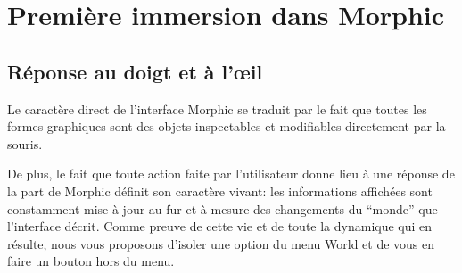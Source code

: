 \documentclass[a4paper,10pt,twoside]{book}
\begin{document}
\section{Première immersion dans Morphic}

\subsection{Réponse au doigt et à l'\oe il}
Le caractère direct de l'interface Morphic se traduit par le fait
que toutes les formes graphiques sont des objets 
inspectables et modifiables directement par la souris.

De plus, le fait que toute action faite par l'utilisateur donne lieu
à une réponse de la part de Morphic définit son caractère
vivant: les informations affichées sont constamment mise à jour
au fur et à mesure des changements du ``monde'' que l'interface
décrit. 
Comme preuve de cette vie et de toute la dynamique qui en résulte,
nous vous proposons d'isoler une option du menu World et de vous
en faire un bouton hors du menu.

\end{document}

